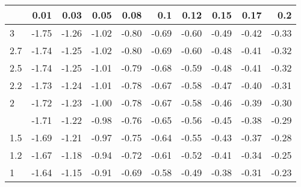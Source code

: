 
\begin{tabular}{lrrrrrrrrr}
\toprule
  & 0.01 & 0.03 & 0.05 & 0.08 & 0.1 & 0.12 & 0.15 & 0.17 & 0.2\\
\midrule
3 & -1.75 & -1.26 & -1.02 & -0.80 & -0.69 & -0.60 & -0.49 & -0.42 & -0.33\\
2.7 & -1.74 & -1.25 & -1.02 & -0.80 & -0.69 & -0.60 & -0.48 & -0.41 & -0.32\\
2.5 & -1.74 & -1.25 & -1.01 & -0.79 & -0.68 & -0.59 & -0.48 & -0.41 & -0.32\\
2.2 & -1.73 & -1.24 & -1.01 & -0.78 & -0.67 & -0.58 & -0.47 & -0.40 & -0.31\\
2 & -1.72 & -1.23 & -1.00 & -0.78 & -0.67 & -0.58 & -0.46 & -0.39 & -0.30\\
\addlinespace
1.7 & -1.71 & -1.22 & -0.98 & -0.76 & -0.65 & -0.56 & -0.45 & -0.38 & -0.29\\
1.5 & -1.69 & -1.21 & -0.97 & -0.75 & -0.64 & -0.55 & -0.43 & -0.37 & -0.28\\
1.2 & -1.67 & -1.18 & -0.94 & -0.72 & -0.61 & -0.52 & -0.41 & -0.34 & -0.25\\
1 & -1.64 & -1.15 & -0.91 & -0.69 & -0.58 & -0.49 & -0.38 & -0.31 & -0.23\\
\bottomrule
\end{tabular}
